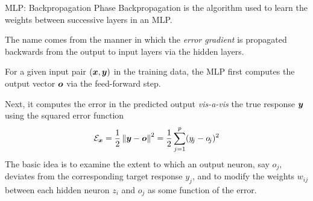 \begin{frame}{MLP: Backpropagation Phase}
%
Backpropagation is the algorithm used to learn the weights between
successive layers in an MLP. 

	\medskip

	The name comes from the manner in which the
{\em error gradient} is propagated backwards from the output to input layers via
the hidden layers. %
%


\medskip 
%
For a given input pair $({\boldsymbol x}, {\boldsymbol y})$ in the training data, the MLP first computes the
output vector  ${\boldsymbol o}$ via the feed-forward step.%

\medskip

Next, it computes the error in the predicted output {\em vis-a-vis} 
the true
response ${\boldsymbol y}$ using the squared error function
\begin{align*}
    {\mathcal E}_{\boldsymbol x} = \frac{1}{2} \left\lVert{\boldsymbol y} - {\boldsymbol o}\right\rVert^2 = 
    \frac{1}{2} \sum^{p}_{j=1} (y_{\!j} - o_{\!j})^2
\end{align*}
The basic idea %
is to examine the extent to which
an output neuron, say $o_{\!j}$, deviates from the corresponding 
target response $y_{\!j}$, and to modify the
weights $w_{ij}$ between each hidden neuron $z_i$ and $o_{\!j}$ as some
function of the error.%
%
\end{frame}

